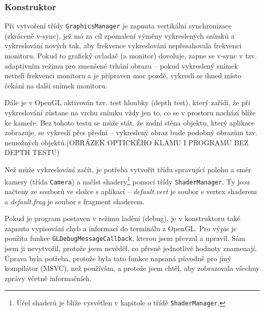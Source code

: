 \documentclass[a4paper, 12pt]{report}
\begin{document}
\subsubsection{Konstruktor}
Při vytvoření třídy \texttt{GraphicsManager} je zapnuta vertikální synchronizace (zkráceně v-sync), jež má za cíl zpomalení výměny vykreslených snímků a vykreslování nových tak, aby frekvence vykreslování nepřesahovala frekvenci monitoru. Pokud to grafický ovladač (a monitor) dovoluje, zapne se v-sync v tzv. adaptivním režimu pro zmenšené trhání obrazu -- pokud vykreslený snímek netrefí frekvenci monitoru a je připraven moc pozdě, vykreslí se ihned místo čekání na další snímek monitoru.

Dále je v OpenGL aktivován tzv. test hloubky (depth test), který zařídí, že při vykreslování zůstane na vrchu snímku vždy jen to, co se v prostoru nachází blíže ke kameře. Bez tohoto testu se může stát, že zadní stěna objektu, který aplikace zobrazuje, se vykreslí přes přední -- vykreslený obraz bude podobný obrazům tzv. nemožných objektů.(OBRÁZEK OPTICKÉHO KLAMU I PROGRAMU BEZ DEPTH TESTU)

Než může vykreslování začít, je potřeba vytvořit třídu spravující polohu a směr kamery (třída \texttt{Camera}) a načíst shadery\footnote{Účel shaderů je blíže vysvětlen v kapitole o třídě \texttt{ShaderManager}.} pomocí třídy \texttt{ShaderManager}. Ty jsou načteny ze souborů ve složce s aplikací -- \emph{default.vert} je soubor s vertex shaderem a \emph{default.frag} je soubor s fragment shaderem.

Pokud je program postaven v režimu ladění (debug), je v konstruktoru také zapnuto vypisování chyb a informací do terminálu z OpenGL. Pro výpis je použita funkce \texttt{GLDebugMessageCallback}, kterou jsem převzal a upravil. Sám jsem ji nevytvořil, protože jsem nevěděl, co přesně jednotlivé hodnoty znamenají. Úprava byla potřeba, protože byla tato funkce napsaná původně pro jiný kompilátor (MSVC), než používám, a protože jsem chtěl, aby zobrazovala všechny zprávy včetně informačních.
\end{document}
